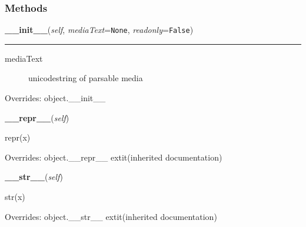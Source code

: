 
  \subsubsection{Methods}

    \vspace{0.5ex}

\hspace{.8\funcindent}\begin{boxedminipage}{\funcwidth}

    \raggedright \textbf{\_\_init\_\_}(\textit{self}, \textit{mediaText}={\tt None}, \textit{readonly}={\tt False})

    \vspace{-1.5ex}

    \rule{\textwidth}{0.5\fboxrule}
\setlength{\parskip}{2ex}
\begin{description}
\item[{mediaText}] \leavevmode 
unicodestring of parsable media

\end{description}
\setlength{\parskip}{1ex}
      Overrides: object.\_\_init\_\_

    \end{boxedminipage}

    \vspace{0.5ex}

\hspace{.8\funcindent}\begin{boxedminipage}{\funcwidth}

    \raggedright \textbf{\_\_repr\_\_}(\textit{self})

\setlength{\parskip}{2ex}
    repr(x)

\setlength{\parskip}{1ex}
      Overrides: object.\_\_repr\_\_ 	extit{(inherited documentation)}

    \end{boxedminipage}

    \vspace{0.5ex}

\hspace{.8\funcindent}\begin{boxedminipage}{\funcwidth}

    \raggedright \textbf{\_\_str\_\_}(\textit{self})

\setlength{\parskip}{2ex}
    str(x)

\setlength{\parskip}{1ex}
      Overrides: object.\_\_str\_\_ 	extit{(inherited documentation)}

    \end{boxedminipage}


